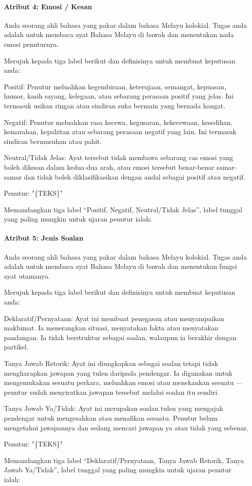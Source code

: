 \documentclass[11pt]{article}
\begin{document}
\paragraph{Atribut 4: Emosi / Kesan}
\begin{PromptBlock}
Anda seorang ahli bahasa yang pakar dalam bahasa Melayu kolokial. Tugas anda adalah untuk membaca ayat Bahasa Melayu di bawah dan menentukan nada emosi penuturnya.

Merujuk kepada tiga label berikut dan definisinya untuk membuat keputusan anda:

Positif: Penutur meluahkan kegembiraan, keterujaan, semangat, kepuasan, humor, kasih sayang, kelegaan, atau sebarang perasaan positif yang jelas. Ini termasuk usikan ringan atau sindiran suka bermain yang bernada hangat.

Negatif: Penutur meluahkan rasa kecewa, kegusaran, kekecewaan, kesedihan, kemarahan, kepahitan atau sebarang perasaan negatif yang lain. Ini termasuk sindiran bermusuhan atau pahit.

Neutral/Tidak Jelas: Ayat tersebut tidak membawa sebarang cas emosi yang boleh dikesan dalam kedua-dua arah, atau emosi tersebut benar-benar samar-samar dan tidak boleh diklasifikasikan dengan andal sebagai positif atau negatif.

Penutur: "\{TEKS\}"

Memandangkan tiga label “Positif, Negatif, Neutral/Tidak Jelas”, label tunggal yang paling mungkin untuk ujaran penutur ialah:
\end{PromptBlock}

\paragraph{Atribut 5: Jenis Soalan}
\begin{PromptBlock}
Anda seorang ahli bahasa yang pakar dalam bahasa Melayu kolokial. Tugas anda adalah untuk membaca ayat Bahasa Melayu di bawah dan menentukan fungsi ayat utamanya.

Merujuk kepada tiga label berikut dan definisinya untuk membuat keputusan anda:

Deklaratif/Pernyataan: Ayat ini membuat penegasan atau menyampaikan maklumat. Ia menerangkan situasi, menyatakan fakta atau menyatakan pandangan. Ia tidak berstruktur sebagai soalan, walaupun ia berakhir dengan partikel.

Tanya Jawab Retorik: Ayat ini diungkapkan sebagai soalan tetapi tidak mengharapkan jawapan yang tulen daripada pendengar. Ia digunakan untuk mengemukakan sesuatu perkara, meluahkan emosi atau menekankan sesuatu — penutur sudah menyiratkan jawapan tersebut melalui soalan itu sendiri.

Tanya Jawab Ya/Tidak: Ayat ini merupakan soalan tulen yang mengajak pendengar untuk mengesahkan atau menafikan sesuatu. Penutur belum mengetahui jawapannya dan sedang mencari jawapan ya atau tidak yang sebenar.

Penutur: "\{TEKS\}"

Memandangkan tiga label “Deklaratif/Pernyataan, Tanya Jawab Retorik, Tanya Jawab Ya/Tidak”, label tunggal yang paling mungkin untuk ujaran penutur ialah:
\end{PromptBlock}
\end{document}
